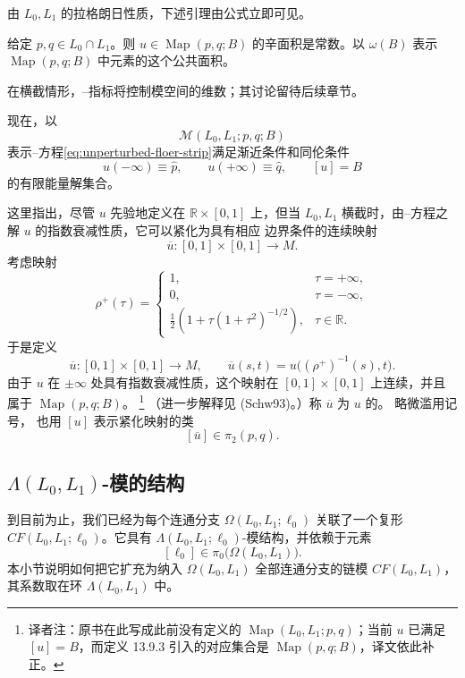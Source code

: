 由 $L_0,L_1$ 的拉格朗日性质，下述引理由\personStokes{}公式立即可见。

\begin{lemma}
\label{lem:symplectic-area-strip-homotopy-class}
给定 $p,q\in L_0\cap L_1$。则
$u\in\operatorname{Map}(p,q;B)$ 的辛面积是常数。以 $\omega(B)$ 表示
$\operatorname{Map}(p,q;B)$ 中元素的这个公共面积。
\end{lemma}

在横截情形，\personMaslov{}--\personViterbo{}指标将控制\personFloer{}模空间的维数；其讨论留待后续章节。

现在，以
\[
  \mathcal M(L_0,L_1;p,q;B)
\]
表示\personCauchy{}--\personRiemann{}方程\eqref{eq:unperturbed-floer-strip}满足渐近条件和同伦条件
\[
  u(-\infty)\equiv\widehat p,
  \qquad
  u(+\infty)\equiv\widehat q,
  \qquad
  [u]=B
\]
的有限能量解集合。

这里指出，尽管 $u$ 先验地定义在 $\mathbb R\times[0,1]$ 上，但当 $L_0,L_1$
横截时，由\personCauchy{}--\personRiemann{}方程之解 $u$ 的指数衰减性质，它可以紧化为具有相应
边界条件的连续映射
\[
  \overline u:[0,1]\times[0,1]\longrightarrow M.
\]
考虑映射
\[
  \rho^+(\tau)
  =
  \begin{cases}
    1,&\tau=+\infty,\\
    0,&\tau=-\infty,\\
    \displaystyle
    \frac12\left(1+\tau(1+\tau^2)^{-1/2}\right),
      &\tau\in\mathbb R.
  \end{cases}
\]
于是定义
\[
  \overline u:[0,1]\times[0,1]\longrightarrow M,
  \qquad
  \overline u(s,t)=u\bigl((\rho^+)^{-1}(s),t\bigr).
\]
由于 $u$ 在 $\pm\infty$ 处具有指数衰减性质，这个映射在
$[0,1]\times[0,1]$ 上连续，并且属于
$\operatorname{Map}(p,q;B)$。
\footnote{译者注：原书在此写成此前没有定义的
$\operatorname{Map}(L_0,L_1;p,q)$；当前 $u$ 已满足 $[u]=B$，而定义 13.9.3
引入的对应集合是 $\operatorname{Map}(p,q;B)$，译文依此补正。}
（进一步解释见 (Schw93)。）称 $\overline u$ 为 $u$ 的\emph{\termCompactifiedMap{}}。
略微滥用记号，
也用 $[u]$ 表示紧化映射的类
\[
  [\overline u]\in\pi_2(p,q).
\]

\subsection{\texorpdfstring{$\Lambda(L_0,L_1)$-模的结构}{\personNovikov{}环上的模结构}}
\label{subsec:global-novikov-module-structure}

到目前为止，我们已经为每个连通分支 $\Omega(L_0,L_1;\ell_0)$ 关联了一个\personFloer{}复形 $CF(L_0,L_1;\ell_0)$。它具有
$\Lambda(L_0,L_1;\ell_0)$-模结构，并依赖于元素
\[
  [\ell_0]\in\pi_0\bigl(\Omega(L_0,L_1)\bigr).
\]
本小节说明如何把它扩充为纳入 $\Omega(L_0,L_1)$ 全部连通分支的\personFloer{}链模
$CF(L_0,L_1)$，其系数取在\personNovikov{}环 $\Lambda(L_0,L_1)$ 中。


